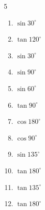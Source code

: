 \begin{multicols}{5}
\begin{enumerate}
        \phantom{$\displaystyle =0$}

  \item $\displaystyle \sin{30^\circ}$


  \item $\displaystyle \tan{120^\circ}$


  \item $\displaystyle \sin{30^\circ}$


  \item $\displaystyle \sin{90^\circ}$

        \phantom{$\displaystyle =1$}

  \item $\displaystyle \sin{60^\circ}$


  \item $\displaystyle \tan{90^\circ}$

        \phantom{$\displaystyle なし$}

  \item $\displaystyle \cos{180^\circ}$

        \phantom{$\displaystyle =-1$}

  \item $\displaystyle \cos{90^\circ}$

        \phantom{$\displaystyle =0$}

  \item $\displaystyle \sin{135^\circ}$


  \item $\displaystyle \tan{180^\circ}$

        \phantom{$\displaystyle =0$}

  \item $\displaystyle \tan{135^\circ}$

        \phantom{$\displaystyle =-1$}

  \item $\displaystyle \tan{180^\circ}$

        \phantom{$\displaystyle =0$}

\columnbreak %

\resetques


\end{enumerate}
\end{multicols}
